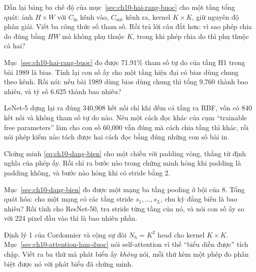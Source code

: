 \exercises

\tierunderstand

\begin{bt}
  \item Dẫn lại bảng ba chế độ của mục~\ref{sec:ch10-hai-rang-buoc} cho một
    tầng tổng quát: ảnh \(H \times W\) với \(C_{\text{in}}\) kênh vào,
    \(C_{\text{out}}\) kênh ra, kernel \(K \times K\), giữ nguyên độ phân giải.
    Viết ba công thức số tham số. Rồi trả lời câu đắt hơn: vì sao phép chia do
     đúng bằng \(HW\) mà không phụ thuộc
    \(K\), trong khi phép chia do  thì phụ thuộc cả
    hai?

  \item Mục~\ref{sec:ch10-hai-rang-buoc} đo được 71.91\% tham số tự do của tầng
    H1 trong bài 1989 là bias. Tính lại con số ấy cho một tầng
     hiện đại có bias dùng chung theo kênh. Rồi nói: nếu bài
    1989 dùng bias dùng chung thì tổng 9,760 thành bao nhiêu, và tỷ số 6.625
    thành bao nhiêu?

  \item LeNet-5 dựng lại ra đúng 340,908 kết nối chỉ khi đếm cả tầng ra RBF, vốn
    có 840 kết nối và không tham số tự do nào. Nêu một cách đọc khác của cụm
    \enquote{trainable free parameters} làm cho con số 60,000 vẫn đúng mà cách
    chia tầng thì khác, rồi nói phép kiểm nào tách được hai cách đọc bằng đúng
    những con số bài in.

  \item Chứng minh \eqref{eq:ch10-dang-bien} cho  một
    chiều với padding vòng, thẳng từ định nghĩa của phép ấy. Rồi chỉ ra bước nào
    trong chứng minh hỏng khi padding là padding không, và bước nào hỏng khi có
    stride bằng 2.

  \item Mục~\ref{sec:ch10-dang-bien} đo được một mạng ba tầng pooling
     ở bội của 8. Tổng quát hóa: cho một mạng có các
    tầng stride
    \(s_1, \dots, s_L\), chu kỳ đẳng biến là bao nhiêu? Rồi tính cho ResNet-50,
    tra stride từng tầng của nó, và nói con số ấy so với 224 pixel đầu vào thì
    là bao nhiêu phần.

  \item Định lý 1 của Cordonnier và cộng sự đòi \(N_h = K^2\) head cho kernel
    \(K \times K\). Mục~\ref{sec:ch10-attention-lam-duoc} nói self-attention vì
    thế \enquote{biểu diễn được} tích chập. Viết ra ba thứ mà phát biểu ấy
    \emph{không} nói, mỗi thứ kèm một phép đo phân biệt được nó với phát biểu đã
    chứng minh.


\end{bt}
